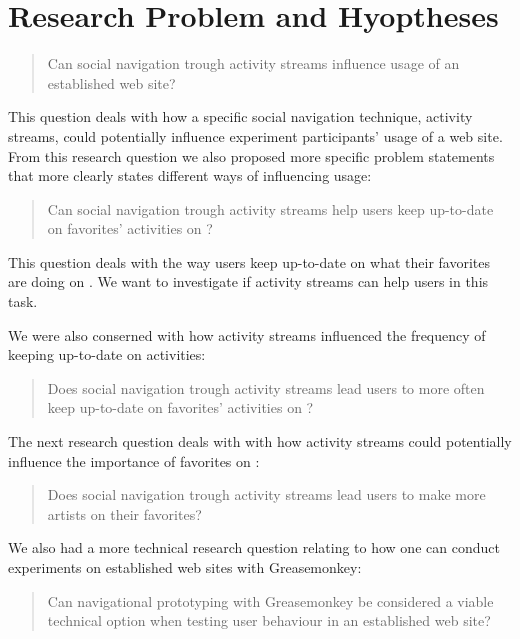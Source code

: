 \section{Research Problem and Hyoptheses}

\begin{quote}
  Can social navigation trough activity streams influence
  usage of an established web site?
\end{quote}

This question deals with how a specific social navigation technique, activity
streams, could potentially influence experiment participants' usage of a web
site.
From this research question we also proposed more specific problem statements
that more clearly states different ways of influencing usage:

\begin{quote}
  Can social navigation trough activity streams help users keep
  up-to-date on favorites' activities on \urort{}?
\end{quote}

This question deals with the way users keep up-to-date on what their favorites
are doing on \urort{}. We want to investigate if activity streams can help
users in this task.

We were also conserned with how activity streams influenced the
frequency of keeping up-to-date on activities:

\begin{quote}
  Does social navigation trough activity streams lead users to more often keep
  up-to-date on favorites' activities on \urort{}?
\end{quote}

The next research question deals with with how activity streams could
potentially influence the importance of favorites on \urort{}:

\begin{quote}
  Does social navigation trough activity streams lead users to make
  more artists on \urort{} their favorites?
\end{quote}

We also had a more technical research question relating to how one can
conduct experiments on established web sites with Greasemonkey:

\begin{quote}
  Can navigational prototyping with Greasemonkey be considered a
  viable technical option when testing user behaviour in an
  established web site?
\end{quote}

